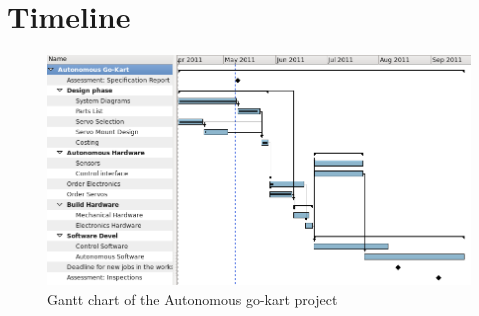 \section{Timeline}


  \begin{figure}[h]
    \centering
    \includegraphics[width=1.0\textwidth]{Images/Gantt.png}
    \caption{Gantt chart of the Autonomous go-kart project}
    \label{gantt_chart}
  \end{figure}
